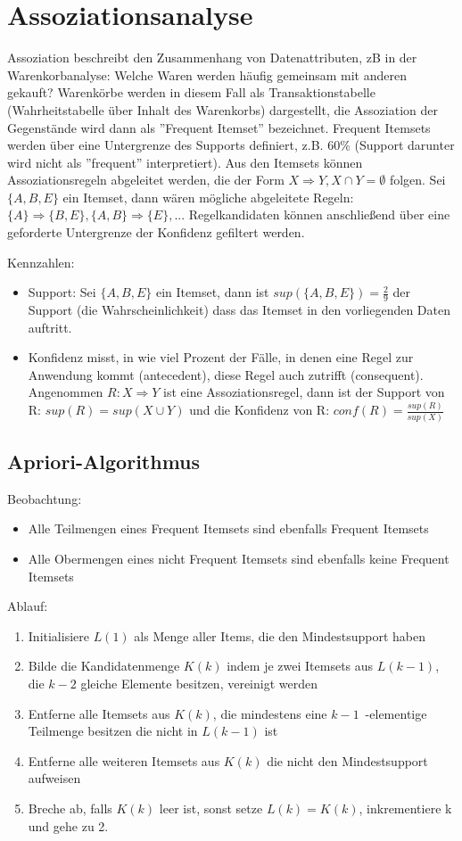 \documentclass{article}
\begin{document}
\section{Assoziationsanalyse}
Assoziation beschreibt den Zusammenhang von Datenattributen, zB in der Warenkorbanalyse: Welche Waren werden häufig gemeinsam mit anderen gekauft?
Warenkörbe werden in diesem Fall als Transaktionstabelle (Wahrheitstabelle über Inhalt des Warenkorbs) dargestellt, 
die Assoziation der Gegenstände wird dann als ''Frequent Itemset'' bezeichnet.
Frequent Itemsets werden über eine Untergrenze des Supports definiert, z.B. 60\%  (Support darunter wird nicht als ''frequent''  interpretiert).
Aus den Itemsets können Assoziationsregeln abgeleitet werden, die der Form $X \Rightarrow Y, X \cap Y= \emptyset $ folgen.
Sei $\{A,B,E\}$ ein Itemset, dann wären mögliche abgeleitete Regeln: $ \{A\} \Rightarrow \{B,E\}, \{A,B\} \Rightarrow \{E\}, ... $
Regelkandidaten können anschließend über eine geforderte Untergrenze der Konfidenz gefiltert werden.


Kennzahlen:
\begin{itemize}
    \item Support: Sei $ \{ A,B,E\} $ ein Itemset, dann ist $sup(\{A,B,E\}) = \frac{2}{9}$ der Support (die Wahrscheinlichkeit)
    dass das Itemset in den vorliegenden Daten auftritt.
    \item Konfidenz misst, in wie viel Prozent der Fälle, in denen eine Regel zur Anwendung kommt (antecedent), diese Regel auch zutrifft (consequent).
    Angenommen $ R : X\Rightarrow Y $ ist eine Assoziationsregel,
    dann ist der Support von R: $ sup(R) = sup(X\cup Y)$
    und die Konfidenz von R: $ conf(R) = \frac{sup(R)}{sup(X)}$
\end{itemize}

\subsection{Apriori-Algorithmus}
Beobachtung:
\begin{itemize}
    \item Alle Teilmengen eines Frequent Itemsets sind ebenfalls Frequent Itemsets
    \item Alle Obermengen eines nicht Frequent Itemsets sind ebenfalls keine Frequent Itemsets
\end{itemize}
Ablauf:
\begin{enumerate}
    \item Initialisiere $L(1)$ als Menge aller Items, die den Mindestsupport haben
    \item Bilde die Kandidatenmenge $K(k)$ indem je zwei Itemsets aus $L(k-1)$, die $k-2$ gleiche Elemente besitzen, vereinigt werden
    \item Entferne alle Itemsets aus $K(k)$, die mindestens eine $k-1$~-elementige Teilmenge besitzen die nicht in $L(k-1)$ ist
    \item Entferne alle weiteren Itemsets aus $K(k)$ die nicht den Mindestsupport aufweisen
    \item Breche ab, falls $K(k)$ leer ist, sonst setze $L(k) = K(k)$, inkrementiere k und gehe zu 2.
\end{enumerate}
\end{document}
